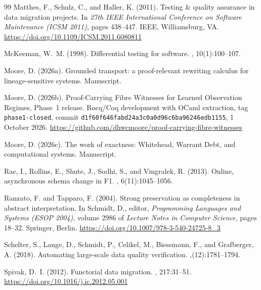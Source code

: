 \documentclass[11pt]{article}
\theoremstyle{definition}
\newcommand{\code}[1]{\texttt{#1}}
\begin{document}
\begin{thebibliography}{99}
Matthes, F., Schulz, C., and Haller, K. (2011).
\newblock Testing \& quality assurance in data migration projects.
\newblock In {\em 27th IEEE International Conference on Software Maintenance
  (ICSM 2011)}, pages 438--447. IEEE, Williamsburg, VA.
\newblock \url{https://doi.org/10.1109/ICSM.2011.6080811}

McKeeman, W.~M. (1998).
\newblock Differential testing for software.
, 10(1):100--107.

Moore, D. (2026a).
\newblock Grounded transport: a proof-relevant rewriting calculus for lineage-sensitive systems.
\newblock Manuscript.

Moore, D. (2026b).
\newblock Proof-Carrying Fibre Witnesses for Learned Observation Regimes, Phase~1 release.
\newblock Rocq/Coq development with OCaml extraction, tag \code{phase1-closed},
  commit \nolinkurl{d1f60f646fabd24a3c0a0d96c6ba96246edb1155}, 1 October 2026.
\newblock \url{https://github.com/dhwcmoore/proof-carrying-fibre-witnesses}

Moore, D. (2026c).
\newblock The work of exactness: Whitehead, Warrant Debt, and computational systems.
\newblock Manuscript.

Rae, I., Rollins, E., Shute, J., Sodhi, S., and Vingralek, R. (2013).
\newblock Online, asynchronous schema change in {F1}.
, 6(11):1045--1056.

Ranzato, F. and Tapparo, F. (2004).
\newblock Strong preservation as completeness in abstract interpretation.
\newblock In Schmidt, D., editor, {\em Programming Languages and Systems (ESOP
  2004)}, volume 2986 of {\em Lecture Notes in Computer Science}, pages 18--32.
  Springer, Berlin.
\newblock \url{https://doi.org/10.1007/978-3-540-24725-8_3}

Schelter, S., Lange, D., Schmidt, P., Celikel, M., Biessmann, F., and Grafberger, A. (2018).
\newblock Automating large-scale data quality verification.
,(12):1781--1794.

Spivak, D.~I. (2012).
\newblock Functorial data migration.
, 217:31--51.
\newblock \url{https://doi.org/10.1016/j.ic.2012.05.001}


\end{thebibliography}
\end{document}
